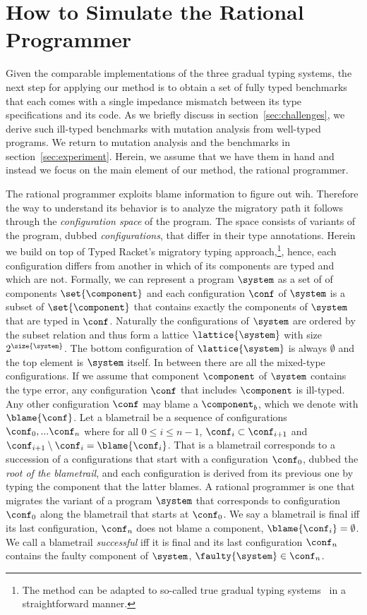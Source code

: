 \section{How to Simulate the Rational Programmer} \label{sec:ideas}

Given the comparable implementations of the three gradual typing systems,
the next step for applying our method is to obtain a set of fully
typed benchmarks that each comes with a single impedance mismatch between
its type specifications and its code. As we briefly discuss in
section~\ref{sec:challenges}, we derive such ill-typed benchmarks with
mutation analysis from well-typed programs.  We return to mutation
analysis and the benchmarks in section~\ref{sec:experiment}.  Herein,
we assume that we have them in hand and instead we focus on the
main element of our method, the rational programmer.  


The rational programmer exploits blame information to figure out wih. Therefore the way to understand its behavior 
is to analyze the migratory path it follows through the 
\emph{configuration space} of the program. The space
consists of variants of the program, dubbed \emph{configurations}, that 
differ in their type annotations. 
Herein we build on top of Typed Racket's migratory typing
approach,\footnote{The method can be adapted to so-called true gradual typing
systems~\citep{svcb-snapl-2015} in a straightforward manner.}, hence, each configuration differs from another
in which of its components are typed and which are not. Formally, we can
represent a program $\system$ as a set of of components
$\set{\component}$ and each configuration $\conf$ of $\system$ is a subset of 
$\set{\component}$
that contains exactly the components of  $\system$ that are typed in
$\conf$. Naturally the configurations of  $\system$ are ordered by the subset relation and
thus form a lattice $\lattice{\system}$ with size $2^{\size{\system}}$.
The bottom configuration of $\lattice{\system}$ is always $\emptyset$ and
the top element is $\system$ itself. In between there are all the
mixed-type configurations. If we assume that  component $\component$ of $\system$
contains the type error, any configuration $\conf$ that
includes $\component$ is ill-typed. Any other configuration $\conf$ may blame 
a $\component_b$, which we denote with $\blame{\conf}$. Let a blametrail
be a sequence of configurations $\conf_0,...\conf_n$ where 
for all $0 \leq i \leq n - 1$, $\conf_i \subset \conf_{i+1}$ and
$\conf_{i+1} \setminus \conf_i = \blame{\conf_i}$. That is a blametrail
corresponds to a succession of a configurations that start with a
configuration $\conf_0$, dubbed the \emph{root of the blametrail}, and 
each configuration is derived from its previous one by typing the
component that the latter blames. A rational programmer is one that
migrates the variant of a program $\system$ that corresponds to
configuration $\conf_0$ along the blametrail that starts at $\conf_0$.
We say a blametrail is final iff its last configuration, $\conf_n$
does not blame a component, $\blame{\conf_i} = \emptyset$. We call a
blametrail \emph{successful} iff it is final and its last configuration
$\conf_n$ contains the faulty component of $\system$, $\faulty{\system}
\in \conf_n$. 

